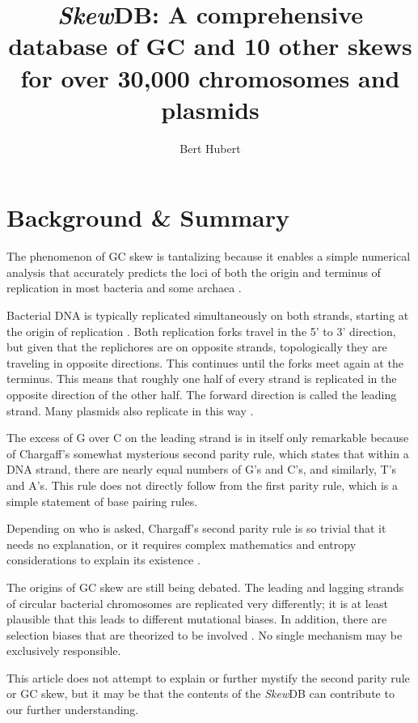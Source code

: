 \documentclass[fleqn,10pt]{wlscirep}
\title{\emph{Skew}DB: A comprehensive database of GC and 10 other skews for over 30,000 chromosomes and plasmids}
\author[*]{Bert Hubert}
\affil[*]{corresponding author: Bert Hubert (bert@hubertnet.nl)}
\begin{document}
\flushbottom
\maketitle
\thispagestyle{empty}

\section*{Background \& Summary}
The phenomenon of GC skew\cite{pmid:10570985, Marn2008, Quan2019} is tantalizing because it enables a simple numerical analysis that accurately predicts the loci of both the origin and terminus of replication in most bacteria and some archaea \cite{lu_skewit_2020,luo_doric_2019}.

Bacterial DNA is typically replicated simultaneously on both strands, starting at the origin of replication \cite{ODonnell2013}. Both replication forks travel in the 5' to 3' direction, but given that the replichores are on opposite strands, topologically they are traveling in opposite directions. This continues until the forks meet again at the terminus. This means that roughly one half of every strand is replicated in the opposite direction of the other half. The forward direction is called the leading strand. Many plasmids also replicate in this way \cite{Lilly2015}.

The excess of G over C on the leading strand is in itself only remarkable because of Chargaff's somewhat mysterious second parity rule\cite{rudner_separation_1968}, which states that within a DNA strand, there are nearly equal numbers of G's and C's, and similarly, T's and A's. This rule does not directly follow from the first parity rule, which is a simple statement of base pairing rules.

Depending on who is asked, Chargaff's second parity rule is so trivial that it needs no explanation, or it requires complex mathematics and entropy considerations to explain its existence \cite{fariselli_dna_2020}.

The origins of GC skew are still being debated. The leading and lagging strands of circular bacterial chromosomes are replicated very differently; it is at least plausible that this leads to different mutational biases. In addition, there are selection biases that are theorized to be involved \cite{tillier_contributions_2000}. No single mechanism may be exclusively responsible.

This article does not attempt to explain or further mystify \cite{zhang_brief_2014} the second parity rule or GC skew, but it may be that the contents of the \emph{Skew}DB can contribute to our further understanding.
\end{document}
